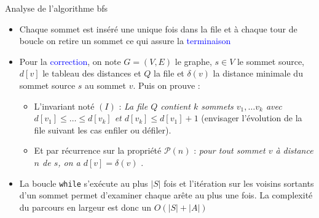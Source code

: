 \documentclass[10pt]{beamer}
\begin{document}
\begin{frame}[fragile]{\Ctitle}{\stitle}
	\begin{block}{Analyse de l'algorithme {\sc bfs}}
		\begin{itemize}
			\item<2-> Chaque sommet est inséré une unique fois dans la file et à chaque tour de boucle on retire un sommet ce qui assure la \textcolor{blue}{terminaison}
			\item<3-> Pour la \textcolor{blue}{correction}, on note $G = (V,E)$ le graphe, $s \in V$ le sommet source, $d[v]$ le tableau des distances et $Q$ la file et $\delta(v)$ la distance minimale du sommet source $s$ au sommet $v$. Puis on prouve : 
			\begin{itemize}
				\item<4-> L'invariant noté $(I)$ : \og{}\textit{La file $Q$ contient $k$ sommets $v_1, \dots v_k$ avec $d[v_1] \leqslant \dots \leqslant d[v_k]$ et $d[v_k] \leqslant d[v_1] +1$} \fg{} (envisager l'évolution de la file suivant les cas enfiler ou défiler). 
				\item<5->Et par récurrence sur la propriété $\mathcal{P}(n)$ : \og{}\textit{pour tout sommet $v$ à distance $n$ de $s$, on a $d[v]=\delta(v)$} \fg{}.
			\end{itemize} 
			\item<6-> La boucle {\tt while} s'exécute au plus $|S|$ fois et l'itération sur les voisins sortants d'un sommet permet d'examiner chaque arête au plus une fois. La complexité du parcours en largeur est donc un $O(|S|+|A|)$
		\end{itemize}
	\end{block}
\end{frame}
\end{document}
